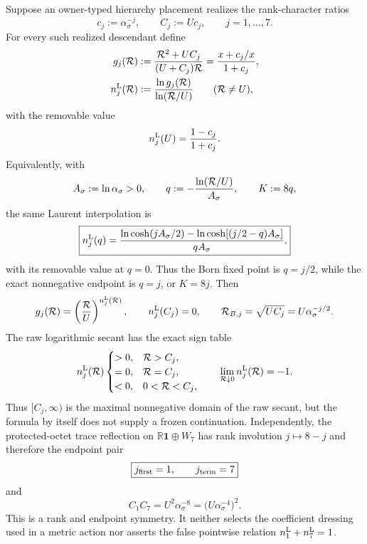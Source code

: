 \documentclass[12pt,a4paper]{article}
\begin{document}
\begin{corollary}
\label{p3d:cor:rank-character-laurent-family}
Suppose an owner-typed hierarchy placement realizes the rank-character ratios
\[
 c_j:=\alpha_\sigma^{-j},\qquad
 C_j:=Uc_j,\qquad j=1,\ldots,7.
\]
For every such realized descendant define
\begin{align}
\label{p3d:eq:rank-character-laurent-family}
 g_j(\mathcal R)
 &:=\frac{\mathcal R^2+UC_j}{(U+C_j)\mathcal R}
   =\frac{x+c_j/x}{1+c_j},\\
 n_j^{\rm L}(\mathcal R)
 &:=\frac{\ln g_j(\mathcal R)}{\ln(\mathcal R/U)}
 \qquad(\mathcal R\ne U),
\end{align}
with the removable value
\[
 n_j^{\rm L}(U)=\frac{1-c_j}{1+c_j}.
\]
Equivalently, with
\[
 A_\sigma:=\ln\alpha_\sigma>0,
 \qquad
 q:=-\frac{\ln(\mathcal R/U)}{A_\sigma},
 \qquad K:=8q,
\]
the same Laurent interpolation is
\begin{equation}
\label{p3d:eq:rank-character-log-clock-form}
 \boxed{
 n_j^{\rm L}(q)
 =\frac{\ln\cosh(jA_\sigma/2)
       -\ln\cosh[(j/2-q)A_\sigma]}
       {qA_\sigma},}
\end{equation}
with its removable value at \(q=0\).  Thus the Born fixed point is
\(q=j/2\), while the exact nonnegative endpoint is \(q=j\), or \(K=8j\).
Then
\[
 g_j(\mathcal R)=\left(\frac{\mathcal R}{U}\right)^{n_j^{\rm L}(\mathcal R)},
 \qquad
 n_j^{\rm L}(C_j)=0,
 \qquad
 \mathcal R_{B,j}=\sqrt{UC_j}=U\alpha_\sigma^{-j/2}.
\]
The raw logarithmic secant has the exact sign table
\begin{equation}
\label{p3d:eq:raw-laurent-index-sign}
 n_j^{\rm L}(\mathcal R)
 \begin{cases}
 >0,&\mathcal R>C_j,\\
 =0,&\mathcal R=C_j,\\
 <0,&0<\mathcal R<C_j,
 \end{cases}
 \qquad
 \lim_{\mathcal R\downarrow0}n_j^{\rm L}(\mathcal R)=-1.
\end{equation}
Thus \([C_j,\infty)\) is the maximal nonnegative domain of the raw secant,
but the formula by itself does not supply a frozen continuation.
Independently, the protected-octet trace reflection on
\(\mathbb R\mathbf1\oplus W_7\) has rank involution
\(j\mapsto8-j\) and therefore the endpoint pair
\[
 \boxed{j_{\rm first}=1,\qquad j_{\rm term}=7}
\]
and
\begin{equation}
\label{p3d:eq:one-seven-complement-product}
 C_1C_7
 =U^2\alpha_\sigma^{-8}
 =\bigl(U\alpha_\sigma^{-4}\bigr)^2.
\end{equation}
This is a rank and endpoint symmetry.  It neither selects the coefficient
dressing used in a metric action nor asserts the false pointwise relation
\(n_1^{\rm L}+n_7^{\rm L}=1\).
\end{corollary}
\end{document}
